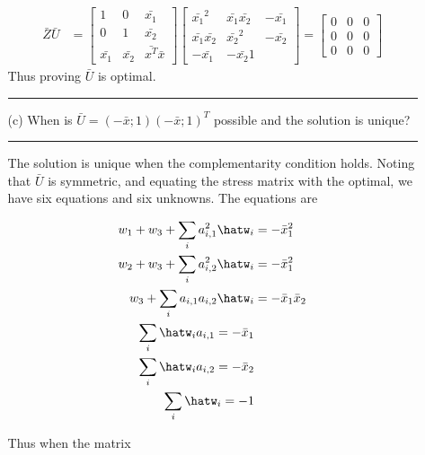 \documentclass{article} %
\newcommand{\h}[1]{\expandafter\hat#1}
\begin{document}
\begin{enumerate}
\begin{itemize}
\begin{equation*}
\begin{aligned}
\bar{Z}\bar{U} &= \begin{bmatrix} 1 & 0 &  \bar{x_1} \\  0 & 1 & \bar{x_2} \\ \bar{x_1} & \bar{x_2} & \bar{x^T} \bar{x} \end{bmatrix} \begin{bmatrix} \bar{x_1}^2 & \bar{x_1} \bar{x_2} & -\bar{x_1} \\ \bar{x_1} \bar{x_2} & \bar{x_2}^2 & - \bar{x_2} \\ - \bar{x_1} & - \bar{x_2} 1 \end{bmatrix} = \begin{bmatrix} 0 & 0 & 0 \\ 0 & 0 & 0 \\ 0 & 0 & 0 \end{bmatrix}
\end{aligned}
\end{equation*}
Thus proving $\bar{U}$ is optimal. 

\rule{\textwidth}{1pt}

\item[(c)] When is $\bar{U}=(-\bar{x};1)(-\bar{x};1)^T$ possible and the solution is unique?

\rule{\textwidth}{1pt}

The solution is unique when the complementarity condition holds. Noting that $\bar{U}$ is symmetric, and equating the stress matrix with the optimal, we have six equations and six unknowns. The equations are

\begin{equation*}
\begin{aligned}
w_1 + w_3 + \sum_{i} a_{i,1}^2 \h{w_i} &= - \bar{x}_1^2 \\ 
w_2 + w_3 + \sum_{i} a_{i,2}^2 \h{w_i} &= - \bar{x}_1^2 \\ 
w_3 + \sum_{i} a_{i,1} a_{i,2} \h{w_i} &= - \bar{x}_1 \bar{x}_2 \\
\sum_{i} \h{w}_i a_{i,1} = - \bar{x}_1 \\ 
\sum_{i} \h{w}_i a_{i,2} = - \bar{x}_2 \\ 
\sum_{i} \h{w}_i = -1
\end{aligned}
\end{equation*}

Thus when the matrix 


\end{itemize}
\end{enumerate}
\end{document}

